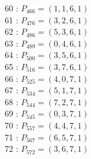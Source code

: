 \documentclass{article}
\begin{document}
{\begin{multicols}{3}
60 : $P_{466}=( 1, 1, 6, 1 )$\\
61 : $P_{476}=( 3, 2, 6, 1 )$\\
62 : $P_{486}=( 5, 3, 6, 1 )$\\
63 : $P_{489}=( 0, 4, 6, 1 )$\\
64 : $P_{500}=( 3, 5, 6, 1 )$\\
65 : $P_{516}=( 3, 7, 6, 1 )$\\
66 : $P_{525}=( 4, 0, 7, 1 )$\\
67 : $P_{534}=( 5, 1, 7, 1 )$\\
68 : $P_{544}=( 7, 2, 7, 1 )$\\
69 : $P_{545}=( 0, 3, 7, 1 )$\\
70 : $P_{557}=( 4, 4, 7, 1 )$\\
71 : $P_{567}=( 6, 5, 7, 1 )$\\
72 : $P_{572}=( 3, 6, 7, 1 )$\\
\end{multicols}


%


%


}%
\end{document}
